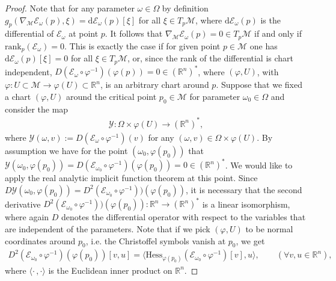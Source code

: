 \documentclass[reqno]{amsart}
\begin{document}
\begin{proof}
    Note that for any parameter $\omega\in \Omega$ by definition $g_{p}(\nabla_\mathcal{M}  \mathcal{E}_{\omega} (p),\xi)=\mathrm{d}\mathcal{E}_{\omega}(p)[\xi]$ for all $\xi \in T_{p}\mathcal{M}$, where $\mathrm{d}\mathcal{E}_{\omega}(p)$ is the differential of $\mathcal{E}_\omega$ at point $p$. It follows that $\nabla_\mathcal{M}  \mathcal{E}_{\omega}(p)=0\in T_{p}\mathcal{M}$ if and only if $\text{rank}_p(\mathcal{E}_{\omega})=0$. This is exactly the case if for given point $p\in \mathcal{M}$ one has $\mathrm{d}\mathcal{E}_\omega(p)[\xi]=0$ for all $\xi \in T_p\mathcal{M}$, or, since the rank of the differential is chart independent, $D(\mathcal{E}_\omega\circ \varphi^{-1})(\varphi(p))=0\in (\mathbb{R}^{n})^*$, where $(\varphi,U)$, with $\varphi:U\subset \mathcal{M}\longrightarrow \varphi(U)\subset \mathbb{R}^n$, is an arbitrary chart around $p$. Suppose that we fixed a chart $(\varphi, U)$ around the critical point $p_0\in \mathcal{M}$ for parameter $\omega_0\in \Omega$ and consider the map
    \begin{align}
        \mathcal{Y}:\Omega\times\varphi(U) \longrightarrow (\mathbb{R}^n)^*,
    \end{align}
    where $\mathcal{Y}(\omega,v):=D(\mathcal{E}_\omega \circ \varphi^{-1})(v)$ for any $(\omega,v)\in \Omega\times \varphi(U)$.
    By assumption we have for the point $(\omega_0,\varphi(p_0))$ that $\mathcal{Y}(\omega_0,\varphi(p_0))=D(\mathcal{E}_{\omega_0} \circ \varphi^{-1})(\varphi(p_0))=0\in (\mathbb{R}^n)^*$. We would like to apply the real analytic implicit function theorem at this point. Since $D\mathcal{Y}(\omega_0,\varphi(p_0))=D^2(\mathcal{E}_{\omega_0} \circ \varphi^{-1}))(\varphi(p_0))$, it is necessary that the second derivative $D^2(\mathcal{E}_{\omega_0} \circ \varphi^{-1}))(\varphi(p_0)):\mathbb{R}^n\longrightarrow (\mathbb{R}^n)^*$ is a linear isomorphism, where again $D$ denotes the differential operator with respect to the variables that are independent of the parameters. Note that if we pick $(\varphi,U)$ to be normal coordinates around $p_0$, i.e. the Christoffel symbols vanish at $p_0$, we get 
    \begin{align}
        D^2(\mathcal{E}_{\omega_0}\circ \varphi^{-1})(\varphi(p_0))[v, u] = \langle\text{Hess}_{\varphi(p_0)}(\mathcal{E}_{\omega_0}\circ \varphi^{-1})[v],u\rangle,\qquad(\forall v, u \in \mathbb{R}^n),
    \end{align}
    where $\langle\cdot\,,\cdot\rangle$ is the Euclidean inner product on $\mathbb{R}^n$.

\end{proof}
\end{document}
